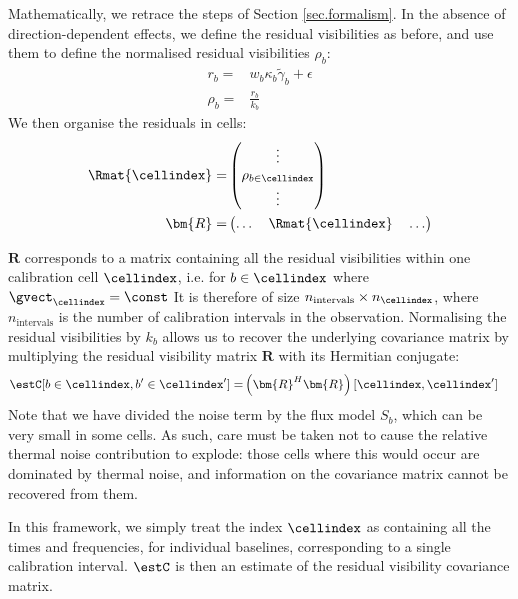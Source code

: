 \pg
Mathematically, we retrace the steps of Section \ref{sec.formalism}. In the absence of direction-dependent effects, we define the residual visibilities as before, and use them to define the normalised residual visibilities $\rho_b$:
\begin{align}
r_{b} =& w_b \kappa_b \tilde{\gamma}_b  + \epsilon \label{eq.residual.matrix}\\
\rho_{b} =& \frac{r_{b}}{k_b}
\end{align}
We then organise the residuals in cells:
\begin{align}
\Rmat{\cellindex} =&   \begin{pmatrix} \vdots \\ \rho_{b\in \cellindex} \\ \vdots \end{pmatrix}\\ %
\bm{R} =&   \begin{pmatrix} \hdots \quad \Rmat{\cellindex} \quad \hdots \end{pmatrix}
\end{align}

\pg
$\bm{R}$ corresponds to a matrix containing all the residual visibilities within one calibration cell $\cellindex$, i.e. for $b \in \cellindex$ where $\gvect_{\cellindex} = \const$ {It is therefore of size $n_{\mathrm{intervals}}\times n_{\cellindex}$, where $n_{\mathrm{intervals}}$ is the number of calibration intervals in the observation}. Normalising the residual visibilities by $k_b$ allows us to recover the underlying covariance matrix by multiplying the residual visibility matrix $\bm{R}$ with its Hermitian conjugate:
\begin{align}
\estC[b\in\cellindex,b'\in\cellindex']             =& \left(\bm{R}^H \bm{R}\right)[\cellindex,\cellindex']
\end{align}
Note that we have divided the noise term by the flux model $S_b$, which can be very small in some cells. As such, care must be taken not to cause the relative thermal noise contribution to explode: those cells where this would occur are dominated by thermal noise, and information on the covariance matrix cannot be recovered from them.

\pg
In this framework, we simply treat the index $\cellindex$ as containing all the times and frequencies, for individual baselines, corresponding to a single calibration interval. $\estC$ is then an estimate of the residual visibility covariance matrix.




